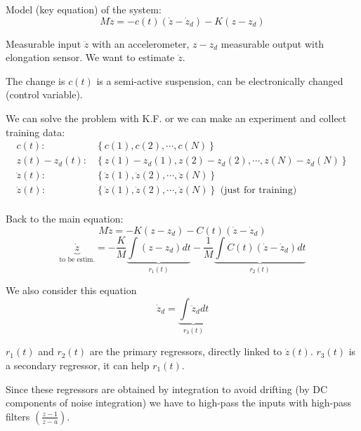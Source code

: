 \begin{example}
    Model (key equation) of the system:
    \[
        M\ddot{z} = -c(t)(\dot{z}-\dot{z}_d) - K(z-z_d)
    \]

    Measurable input $\ddot{z}$ with an accelerometer, $z-z_d$ measurable output with elongation sensor.
    We want to estimate $\dot{z}$.

    The change is $c(t)$ is a semi-active suspension, can be electronically changed (control variable).

    We can solve the problem with K.F. or we can make an experiment and collect training data:
    \begin{align*}
        c(t)        : & \left\{ c(1), c(2), \cdots, c(N) \right\} \\
        z(t)-z_d(t) : & \left\{ z(1)-z_d(1), z(2)-z_d(2), \cdots, z(N)-z_d(N) \right\} \\
        \ddot{z}(t) : & \left\{ \ddot{z}(1), \ddot{z}(2), \cdots, \ddot{z}(N) \right\} \\
        \dot{z}(t)  : & \left\{ \dot{z}(1), \dot{z}(2), \cdots, \dot{z}(N) \right\} \text{ (just for training)} \\
    \end{align*}


    Back to the main equation:
    \[
        M\ddot{z} = -K(z-z_d)-C(t)(\dot{z}-\dot{z}_d)
    \]
    \[
        \underbrace{\dot{z}}_{\text{to be estim.}} =
        -\frac{K}{M} \underbrace{\int (z-z_d)dt}_{r_1(t)}
        -\frac{1}{M} \underbrace{\int C(t)(\dot{z}-\dot{z}_d)dt}_{r_2(t)}
    \]

    We also consider this equation
    \[
        \dot{z}_d = \underbrace{\int \ddot{z}_d dt}_{r_3(t)}
    \]

    $r_1(t)$ and $r_2(t)$ are the primary regressors, directly linked to $\dot{z}(t)$. $r_3(t)$ is a secondary regressor, it can help $r_1(t)$.

    Since these regressors are obtained by integration to avoid drifting (by DC components of noise integration) we have to high-pass the inputs with high-pass filters $\left(\frac{z-1}{z-a}\right)$.


\end{example}
